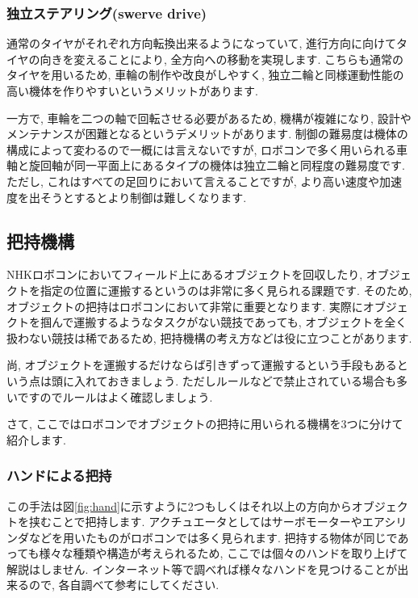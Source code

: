 \subsubsection{独立ステアリング(swerve drive)}
通常のタイヤがそれぞれ方向転換出来るようになっていて, 進行方向に向けてタイヤの向きを変えることにより, 全方向への移動を実現します. こちらも通常のタイヤを用いるため, 車輪の制作や改良がしやすく, 独立二輪と同様運動性能の高い機体を作りやすいというメリットがあります. 

一方で, 車輪を二つの軸で回転させる必要があるため, 機構が複雑になり, 設計やメンテナンスが困難となるというデメリットがあります. 制御の難易度は機体の構成によって変わるので一概には言えないですが, ロボコンで多く用いられる車軸と旋回軸が同一平面上にあるタイプの機体は独立二輪と同程度の難易度です. 
ただし, これはすべての足回りにおいて言えることですが, より高い速度や加速度を出そうとするとより制御は難しくなります. 

\subsection{把持機構}
NHKロボコンにおいてフィールド上にあるオブジェクトを回収したり, オブジェクトを指定の位置に運搬するというのは非常に多く見られる課題です. 
そのため, オブジェクトの把持はロボコンにおいて非常に重要となります. 実際にオブジェクトを掴んで運搬するようなタスクがない競技であっても, オブジェクトを全く扱わない競技は稀であるため, 把持機構の考え方などは役に立つことがあります. 

尚, オブジェクトを運搬するだけならば引きずって運搬するという手段もあるという点は頭に入れておきましょう. ただしルールなどで禁止されている場合も多いですのでルールはよく確認しましょう. 

さて, ここではロボコンでオブジェクトの把持に用いられる機構を3つに分けて紹介します.　

\subsubsection{ハンドによる把持}
この手法は図\ref{fig:hand}に示すように2つもしくはそれ以上の方向からオブジェクトを挟むことで把持します. 
アクチュエータとしてはサーボモーターやエアシリンダなどを用いたものがロボコンでは多く見られます. 
把持する物体が同じであっても様々な種類や構造が考えられるため, ここでは個々のハンドを取り上げて解説はしません. 
インターネット等で調べれば様々なハンドを見つけることが出来るので, 各自調べて参考にしてください. 


